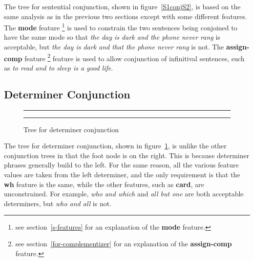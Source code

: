The tree for sentential conjunction, shown in figure~\ref{S1conjS2}, is
based on the same analysis as in the previous two sections except with
some different features.  The {\bf mode}
feature \footnote{see section~\ref{s-features} 
for an explanation of the {\bf mode} feature.} 
is used to 
constrain the two sentences being conjoined to have the same mode so that
{\it the day is dark and the phone never rang} is acceptable, but 
{\it the day is dark and that the phone never rang} is not.  The 
{\bf assign-comp} feature \footnote{see section~\ref{for-complementizer} 
for an explanation of the {\bf assign-comp} feature.} 
feature is used to allow conjunction of infinitival sentences, such as
{\it to read and to sleep is a good life}.

\subsection{Determiner Conjunction}
\begin{figure}[ht]
\centering
\rule[.1in]{5.0in}{0.01in}
\caption{Tree for determiner conjunction}
\rule[.1in]{5.0in}{0.01in}
\label{DX1conjDX2}
\end{figure}

The tree for determiner conjunction, shown in figure~\ref{DX1conjDX2},
is unlike the other conjunction trees in that the foot node is on the right.
This is because 
determiner phrases generally build to the left. For the same reason,
all the various feature values are taken from the left determiner, and the
only requirement is that the {\bf wh} feature is the same, while the
other features, such as {\bf card}, are unconstrained.  For example,
{\it who and which} and {\it all but one} are both acceptable determiners,
but {\it who and all} is not. 

